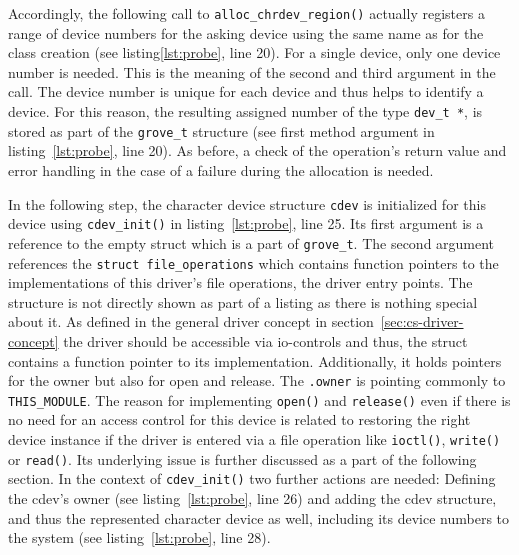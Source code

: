 Accordingly, the following call to \texttt{alloc_chrdev_region()} actually registers a range of device numbers for the asking device using the same name as for the class creation (see listing\ref{lst:probe}, line 20).
For a single device, only one device number is needed.
This is the meaning of the second and third argument in the call.
The device number is unique for each device and thus helps to identify a device.
For this reason, the resulting assigned number of the type \texttt{dev_t *}, is stored as part of the \texttt{grove_t} structure (see first method argument in listing~\ref{lst:probe}, line 20).
As before, a check of the operation's return value and error handling in the case of a failure during the allocation is needed.

In the following step, the character device structure \texttt{cdev} is initialized for this device using \texttt{cdev_init()} in listing~\ref{lst:probe}, line 25. 
Its first argument is a reference to the empty struct which is a part of \texttt{grove_t}.
The second argument references the \texttt{struct file_operations} which contains function pointers to the implementations of this driver's file operations, the driver entry points.
The structure is not directly shown as part of a listing as there is nothing special about it.
As defined in the general driver concept in section~\ref{sec:cs-driver-concept} the driver should be accessible via \ac{io}-controls and thus, the struct contains a function pointer to its implementation.
Additionally, it holds pointers for the owner but also for open and release.
The \texttt{.owner} is pointing commonly to \texttt{THIS_MODULE}.
The reason for implementing \texttt{open()} and \texttt{release()} even if there is no need for an access control for this device is related to restoring the right device instance if the driver is entered via a file operation like \texttt{ioctl()}, \texttt{write()} or \texttt{read()}.
Its underlying issue is further discussed as a part of the following section.
In the context of \texttt{cdev_init()} two further actions are needed: Defining the cdev's owner (see listing~\ref{lst:probe}, line 26) and adding the cdev structure, and thus the represented character device as well, including its device numbers to the system (see listing~\ref{lst:probe}, line 28).

